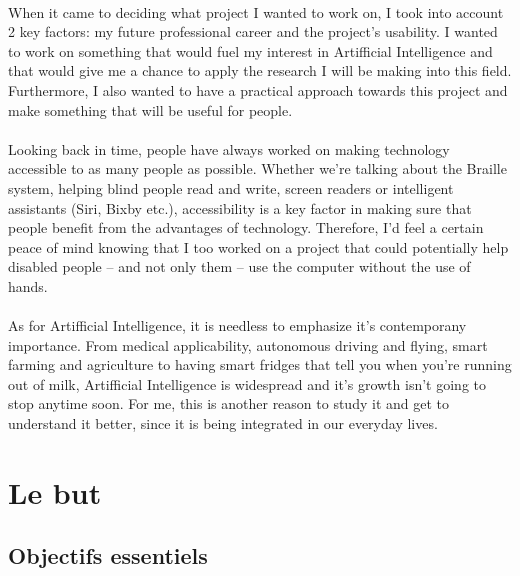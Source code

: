 \paragraph{}
When it came to deciding what project I wanted to work on, I took into account 2 key factors: my future professional career and the project's usability.
I wanted to work on something that would fuel my interest in Artifficial Intelligence and that would give me a chance to apply the research I will be making into this field.
Furthermore, I also wanted to have a practical approach towards this project and make something that will be useful for people.
\paragraph{}
Looking back in time, people have always worked on making technology accessible to as many people as possible.
Whether we're talking about the Braille system, helping blind people read and write, screen readers or intelligent assistants (Siri, Bixby etc.), accessibility is a key factor in making sure that people benefit from the advantages of technology.
Therefore, I'd feel a certain peace of mind knowing that I too worked on a project that could potentially help disabled people – and not only them – use the computer without the use of hands.
\paragraph{}
As for Artifficial Intelligence, it is needless to emphasize it's contemporany importance.
From medical applicability, autonomous driving and flying, smart farming and agriculture to having smart fridges that tell you when you're running out of milk, Artifficial Intelligence is widespread and it's growth isn't going to stop anytime soon.
For me, this is another reason to study it and get to understand it better, since it is being integrated in our everyday lives.

\section{Le but}
\subsection{Objectifs essentiels}

